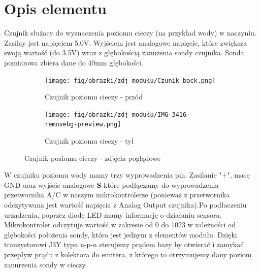 \documentclass[11pt, a4paper]{article}
\author{Hubert Pietrzak}
\institute{Instytut Robotyki i Inteligencji Maszynowej}
\begin{document}
\newpage

\section*{Opis elementu} 


Czujnik służacy do wyznaczenia poziomu cieczy (na przykład wody) w naczyniu. Zasilay jest napięciem 5.0V. Wyjściem jest analogowe napięcie, które zwiększa swoją wartość (do 3.5V) wraz z głębokością zanużenia sondy czujnika. Sonda pomiarowa zbiera dane do 40mm głębokości.



\vspace{0.5cm}
\begin{figure}[h]
\centering
\begin{subfigure}{.5\textwidth}
  \centering
  \texttt{[image: fig/obrazki/zdj\_modułu/Czunik\_back.png]}
  \caption{Czujnik poziomu cieczy - przód}
  \label{fig:sub1}
\end{subfigure}%
\begin{subfigure}{.5\textwidth}
  \centering
  \texttt{[image: fig/obrazki/zdj\_modułu/IMG-3416-removebg-preview.png]}
  \caption{Czujnik poziomu cieczy - tył}
  \label{fig:sub2}
\end{subfigure}
\caption{Czujnik poziomu cieczy - zdjęcia poglądowe}
\label{fig:test}
\end{figure}
\vspace{0.5cm}


W czujniku poziomu wody mamy trzy wyprowadzenia pin. Zasilanie "$+$", masę GND oraz wyjście analogowe \textbf{S} które podłączamy do wyprowadzenia przetwornika A/C w naszym mikrokontrolerze (ponieważ z przetwornika odczytywana jest wartość napięcia z Analog Output czujnika).Po podłaczeniu urządzenia, poprzez diodę LED mamy informację o działaniu sensora.
Mikrokontroler odczytuje wartość w zakresie od 0 do 1023 w zależności od głębokości położenia sondy, która jest jednym z elementów modułu. Dzięki tranzystorowi J3Y typu n-p-n sterujemy prądem bazy by otwierać i zamykać przepływ prądu z kolektora do emitera, z którego to otrzymujemy dany poziom zanurzenia sondy w cieczy.
\end{document}
